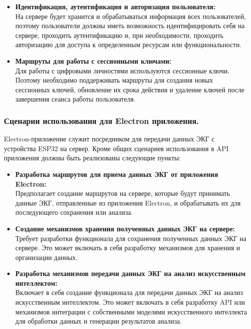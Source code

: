 \documentclass[12pt, russian]{extarticle}
\begin{document}
\begin{spacing}{1.5}
    \begin{itemize}
        \item \textbf{Идентификация, аутентификация и авторизация пользователя:} \\
            На сервере будет хранится и обрабатываться информация всех пользователей, поэтому
            пользователи должны иметь возможность идентифицировать себя на сервере,
            проходить аутентификацию и, при необходимости,
            проходить авторизацию для доступа к определенным ресурсам или функциональности.
        \item \textbf{Маршруты для работы с сессионными ключами:} \\
            Для работы с цифровыми личностями используются сессионные ключи.
            Поэтому необходимо поддерживать маршруты для создания новых сессионных ключей,
            обновление их срока действия и удаление ключей после завершения сеанса работы пользователя.
    \end{itemize}

    \subsubsection{Сценарии использования для Electron приложения.}

    Electron-приложение служит посредником для передачи данных ЭКГ с устройства ESP32 на сервер.
    Кроме общих сценариев использования в API приложения должны быть реализованы следующие пункты:

    \begin{itemize}
        \item \textbf{Разработка маршрутов для приема данных ЭКГ от приложения Electron:} \\
            Предполагает создание маршрутов на сервере, которые будут принимать данные ЭКГ,
            отправленные из приложения Electron, и обрабатывать их для последующего сохранения или анализа.
        \item \textbf{Создание механизмов хранения полученных данных ЭКГ на сервере:} \\
            Требует разработки функционала для сохранения полученных данных ЭКГ на сервере.
            Это может включать в себя разработку механизмов для хранения и организации данных.
        \item \textbf{Разработка механизмов передачи данных ЭКГ на анализ искусственным интеллектом:} \\
            Включает в себя создание функционала для передачи данных ЭКГ на анализ искусственным интеллектом.
            Это может включать в себя разработку API или механизмов интеграции с собственными моделями
            искусственного интеллекта для обработки данных и генерации результатов анализа.
    \end{itemize}


\end{spacing}
\end{document}
